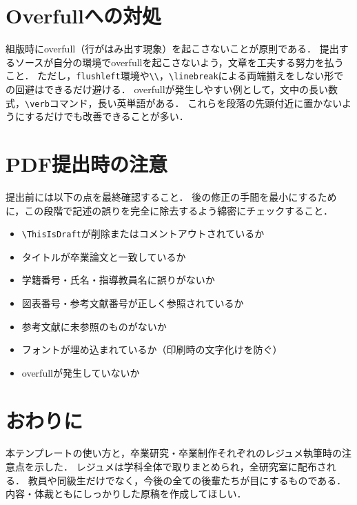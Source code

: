 \section{Overfullへの対処}
\label{sec:overfull}

組版時にoverfull（行がはみ出す現象）を起こさないことが原則である．
提出するソースが自分の環境でoverfullを起こさないよう，文章を工夫する努力を払うこと．
ただし，\texttt{flushleft}環境や\verb|\\|，\verb|\linebreak|による両端揃えをしない形での回避はできるだけ避ける．
overfullが発生しやすい例として，文中の長い数式，\verb|\verb|コマンド，長い英単語がある．
これらを段落の先頭付近に置かないようにするだけでも改善できることが多い．

\section{PDF提出時の注意}
\label{sec:pdf}

提出前には以下の点を最終確認すること．
後の修正の手間を最小にするために，この段階で記述の誤りを完全に除去するよう綿密にチェックすること\cite{ipsj-sample}．
\begin{itemize}
    \item \verb|\ThisIsDraft|が削除またはコメントアウトされているか
    \item タイトルが卒業論文と一致しているか
    \item 学籍番号・氏名・指導教員名に誤りがないか
    \item 図表番号・参考文献番号が正しく参照されているか
    \item 参考文献に未参照のものがないか
    \item フォントが埋め込まれているか（印刷時の文字化けを防ぐ）
    \item overfullが発生していないか
\end{itemize}

\section{おわりに}
\label{sec:conclusion}

本テンプレートの使い方と，卒業研究・卒業制作それぞれのレジュメ執筆時の注意点を示した．
レジュメは学科全体で取りまとめられ，全研究室に配布される．
教員や同級生だけでなく，今後の全ての後輩たちが目にするものである．
内容・体裁ともにしっかりした原稿を作成してほしい．


